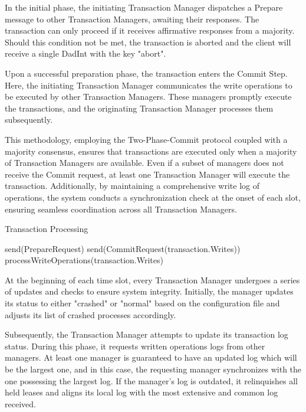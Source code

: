 \documentclass[times, 10pt,twocolumn]{article}
\begin{document}
In the initial phase, the initiating Transaction Manager 
dispatches a Prepare message to other Transaction Managers, 
awaiting their responses. The transaction can only proceed if 
it receives affirmative responses from a majority. Should this 
condition not be met, the transaction is aborted and the client 
will receive a single DadInt with the key "abort".

Upon a successful preparation phase, the transaction enters the 
Commit Step. Here, the initiating Transaction Manager communicates 
the write operations to be executed by other Transaction Managers. 
These managers promptly execute the transactions, and the 
originating Transaction Manager processes them subsequently.

This methodology, employing the Two-Phase-Commit protocol coupled 
with a majority consensus, ensures that transactions are executed 
only when a majority of Transaction Managers are available. Even if 
a subset of managers does not receive the Commit request, at 
least one Transaction Manager will execute the transaction. 
Additionally, by maintaining a comprehensive write log of operations, 
the system conducts a synchronization check at the onset of each slot, 
ensuring seamless coordination across all Transaction Managers.

\begin{algorithm}
    \caption{Transaction Processing}
    \begin{algorithmic}[1]
                \State send(PrepareRequest)
            \EndFor
                \State send(CommitRequest(transaction.Writes))
                \State processWriteOperations(transaction.Writes)
            \EndIf
        \EndFunction
    \end{algorithmic}
\end{algorithm}

At the beginning of each time slot, every Transaction Manager 
undergoes a series of updates and checks to ensure system integrity. 
Initially, the manager updates its status to either "crashed" or 
"normal" based on the configuration file and adjusts its list of 
crashed processes accordingly.

Subsequently, the Transaction Manager attempts to update its 
transaction log status. During this phase, it requests written 
operations logs from other managers. At least one manager is 
guaranteed to have an updated log which will be the largest one, 
and in this case, the requesting manager synchronizes with the 
one possessing the largest log. If the manager's log is outdated, 
it relinquishes all held leases and aligns its local log with 
the most extensive and common log received.
\end{document}
